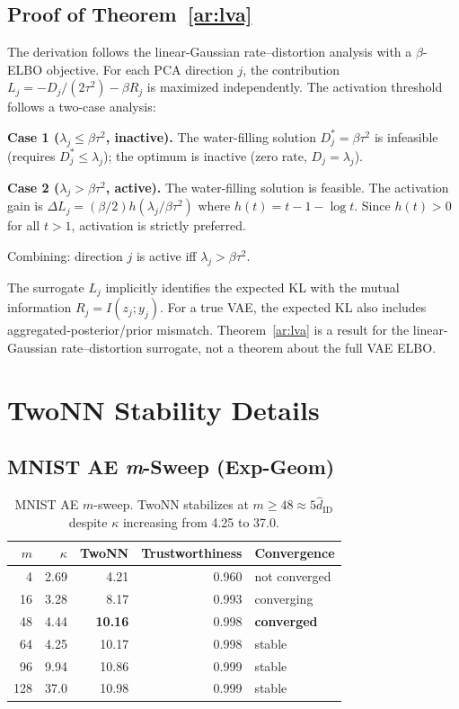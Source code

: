 \documentclass[make,article,submit,pdftex,moreauthors]{Definitions/mdpi}
\newcommand{\kap}{\kappa}
\newcommand{\hatdID}{\hat{d}_{\mathrm{ID}}}
\begin{document}
\subsection{Proof of Theorem~\ref{ar:lva}}\label{app:proof}

The derivation follows the linear-Gaussian rate--distortion analysis
with a $\beta$-ELBO objective.
For each PCA direction $j$, the contribution
$L_j = -D_j / (2\tau^2) - \beta R_j$ is maximized independently.
The activation threshold follows a two-case analysis:

\textbf{Case 1 ($\lambda_j \leq \beta\tau^2$, inactive).}
The water-filling solution $D_j^* = \beta\tau^2$ is infeasible
(requires $D_j^* \leq \lambda_j$); the optimum is inactive
(zero rate, $D_j = \lambda_j$).

\textbf{Case 2 ($\lambda_j > \beta\tau^2$, active).}
The water-filling solution is feasible.
The activation gain is
$\Delta L_j = (\beta/2) h(\lambda_j / \beta\tau^2)$
where $h(t) = t - 1 - \log t$.
Since $h(t) > 0$ for all $t > 1$, activation is strictly preferred.

Combining: direction $j$ is active iff $\lambda_j > \beta\tau^2$.

\begin{Remark}
The surrogate $L_j$ implicitly identifies the expected KL with the mutual
information $R_j = I(z_j; y_j)$.
For a true VAE, the expected KL also includes aggregated-posterior/prior
mismatch.
Theorem~\ref{ar:lva} is a result for the linear-Gaussian rate--distortion
surrogate, not a theorem about the full VAE ELBO.
\end{Remark}

\section[\appendixname~\thesection]{TwoNN Stability Details}\label{app:twonn_detail}

\subsection{MNIST AE \textit{m}-Sweep (Exp-Geom)}

\begin{table}[H]
\caption{MNIST AE $m$-sweep. TwoNN stabilizes at $m \geq 48 \approx 5\hatdID$
despite $\kap$ increasing from 4.25 to 37.0.\label{tab:eq_mnist}}
\small
\begin{tabular}{rrrrl}
\toprule
$m$ & $\kap$ & TwoNN & Trustworthiness & Convergence \\
\midrule
4   & 2.69  & 4.21  & 0.960 & not converged \\
16  & 3.28  & 8.17  & 0.993 & converging \\
48  & 4.44  & \textbf{10.16} & 0.998 & \textbf{converged} \\
64  & 4.25  & 10.17 & 0.998 & stable \\
96  & 9.94  & 10.86 & 0.999 & stable \\
128 & 37.0  & 10.98 & 0.999 & stable \\
\bottomrule
\end{tabular}
\end{table}
\end{document}
